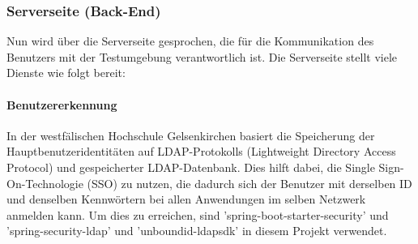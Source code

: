 \documentclass[apaper4,12p]{scrartcl}
\begin{document}
\subsubsection{Serverseite (Back-End)}
Nun wird über die Serverseite gesprochen, die für die Kommunikation des Benutzers mit der Testumgebung verantwortlich ist.
\newline
Die Serverseite stellt viele Dienste wie folgt bereit:
\paragraph{Benutzererkennung} In der westfälischen Hochschule Gelsenkirchen basiert die Speicherung der Hauptbenutzeridentitäten auf LDAP-Protokolls (Lightweight Directory Access Protocol) und gespeicherter LDAP-Datenbank. Dies hilft dabei, die Single Sign-On-Technologie (SSO) zu nutzen, die dadurch sich der Benutzer mit derselben ID und denselben Kennwörtern bei allen Anwendungen im selben Netzwerk anmelden kann. Um dies zu erreichen, sind 'spring-boot-starter-security' und 'spring-security-ldap' und 'unboundid-ldapsdk' in diesem Projekt verwendet.
\end{document}
